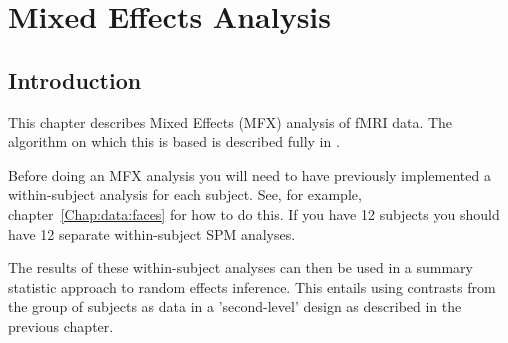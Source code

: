 \chapter{Mixed Effects Analysis \label{Chap:data:mixed_effects}}

\section{Introduction}

This chapter describes Mixed Effects (MFX) analysis of fMRI data. The algorithm on which this is based is described fully in \cite{karl_mixed}.

Before doing an MFX analysis you will need to have previously implemented a within-subject analysis for each subject.
See, for example, chapter~\ref{Chap:data:faces} for how to do this.
If you have 12 subjects you should have 12 separate within-subject SPM analyses.

The results of these within-subject analyses can then be used in a summary statistic approach to random effects inference. This entails using contrasts from the group of subjects as data in a 'second-level' design as described in the previous chapter.

